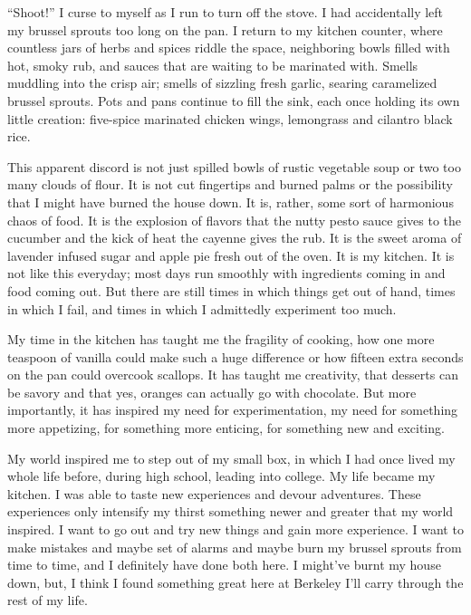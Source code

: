\documentclass{article}
\begin{document}
“Shoot!” I curse to myself as I run to turn off the stove. I had accidentally left my brussel sprouts too long on the pan. I return to my kitchen counter, where countless jars of herbs and spices riddle the space, neighboring bowls filled with hot, smoky rub, and sauces that are waiting to be marinated with. Smells muddling into the crisp air; smells of sizzling fresh garlic, searing caramelized brussel sprouts. Pots and pans continue to fill the sink, each once holding its own little creation: five-spice marinated chicken wings, lemongrass and cilantro black rice. \par
This apparent discord is not just spilled bowls of rustic vegetable soup or two too many clouds of flour. It is not cut fingertips and burned palms or the possibility that I might have burned the house down. It is, rather, some sort of harmonious chaos of food. It is the explosion of flavors that the nutty pesto sauce gives to the cucumber and the kick of heat the cayenne gives the rub. It is the sweet aroma of lavender infused sugar and apple pie fresh out of the oven. It is my kitchen. 
It is not like this everyday; most days run smoothly with ingredients coming in and food coming out. But there are still times in which things get out of hand, times in which I fail, and times in which I admittedly experiment too much. \par
My time in the kitchen has taught me the fragility of cooking, how one more teaspoon of vanilla could make such a huge difference or how fifteen extra seconds on the pan could overcook scallops. It has taught me creativity, that desserts can be savory and that yes, oranges can actually go with chocolate. But more importantly, it has inspired my need for experimentation, my need for something more appetizing, for something more enticing, for something new and exciting. \par
My world inspired me to step out of my small box, in which I had once lived my whole life before, during high school, leading into college. My life became my kitchen. I was able to taste new experiences and devour adventures. These experiences only intensify my thirst something newer and greater that my world inspired. I want to go out and try new things and gain more experience. I want to make mistakes and maybe set of alarms and maybe burn my brussel sprouts from time to time, and I definitely have done both here. I might’ve burnt my house down, but, I think I found something great here at Berkeley I’ll carry through the rest of my life.
\end{document}
